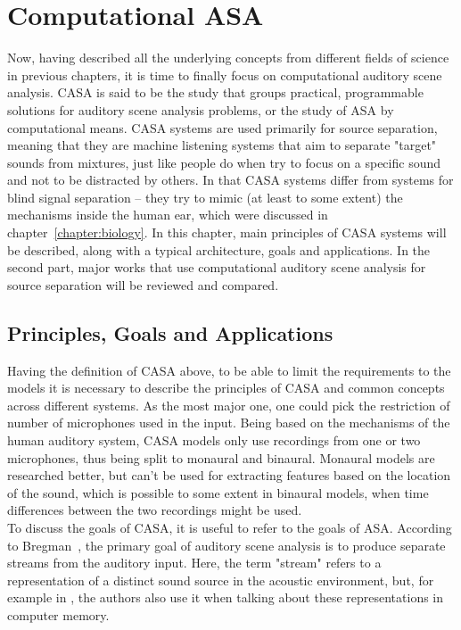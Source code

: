 \chapter{Computational ASA}\label{chapter:casa}

Now, having described all the underlying concepts from different fields of science in previous chapters, it is time to finally focus on computational auditory scene analysis. CASA is said to be the study that groups practical, programmable solutions for auditory scene analysis problems, or the study of ASA by computational means. CASA systems are used primarily for source separation, meaning that they are machine listening systems that aim to separate "target" sounds from mixtures, just like people do when try to focus on a specific sound and not to be distracted by others. In that CASA systems differ from systems for blind signal separation – they try to mimic (at least to some extent) the mechanisms inside the human ear, which were discussed in chapter~\ref{chapter:biology}. In this chapter, main principles of CASA systems will be described, along with a typical architecture, goals and applications. In the second part, major works that use computational auditory scene analysis for source separation will be reviewed and compared.

\section{Principles, Goals and Applications}

Having the definition of CASA above, to be able to limit the requirements to the models it is necessary to describe the principles of CASA and common concepts across different systems. As the most major one, one could pick the restriction of number of microphones used in the input. Being based on the mechanisms of the human auditory system, CASA models only use recordings from one or two microphones, thus being split to monaural and binaural. Monaural models are researched better, but can't be used for extracting features based on the location of the sound, which is possible to some extent in binaural models, when time differences between the two recordings might be used.\\

To discuss the goals of CASA, it is useful to refer to the goals of ASA. According to Bregman~\cite{Bregman1990}, the primary goal of auditory scene analysis is to produce separate streams from the auditory input. Here, the term "stream" refers to a representation of a distinct sound source in the acoustic environment, but, for example in \cite{Wang2006}, the authors also use it when talking about these representations in computer memory.\\

